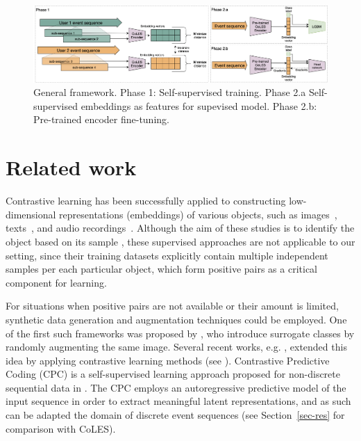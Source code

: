 \documentclass[sigconf]{acmart}
\begin{document}
\begin{figure}[htbp]
  \includegraphics[width=\linewidth]{figures/coles.png}
    \caption{
        General framework.
        Phase 1: Self-supervised training.
        Phase 2.a Self-supervised embeddings as features for supevised model.
        Phase 2.b: Pre-trained encoder fine-tuning.
    }
  \label{fig-arch}
\end{figure}

\section{Related work} \label{sec-rel-work}

Contrastive learning has been successfully applied to constructing low-dimensional representations
(embeddings) of various objects, such as images~\citep{Chopra2005LearningAS,Schroff2015FaceNetAU},
texts~\citep{Reimers2019SentenceBERTSE}, and audio recordings~\citep{Wan2018GeneralizedEL}.
Although the aim of these studies is to identify the object based on its sample
\citep{Schroff2015FaceNetAU,Hu2014DiscriminativeDM,Wan2018GeneralizedEL}, these supervised
approaches are not applicable to our setting, since their training datasets explicitly contain
multiple independent samples per each particular object, which form positive pairs as
a critical component for learning. 

For situations when positive pairs are not available or their amount is limited, synthetic data
generation and augmentation techniques could be employed. One of the first such frameworks was
proposed by \citet{Dosovitskiy2014DiscriminativeUF}, who introduce surrogate classes by randomly
augmenting the same image. Several recent works, e.g. \citep{Bachman2019LearningRB,He2019MomentumCF,Chen2020ASF},
extended this idea by applying contrastive learning methods (see \citep{Falcon2020AFF}).
%
Contrastive Predictive Coding (CPC) is a self-supervised learning approach proposed for non-discrete
sequential data in \citep{Oord2018RepresentationLW}. The CPC employs an autoregressive predictive
model of the input sequence in order to extract meaningful latent representations, and as such
can be adapted the domain of discrete event sequences (see Section~\ref{sec-res} for comparison
with CoLES).
\end{document}
